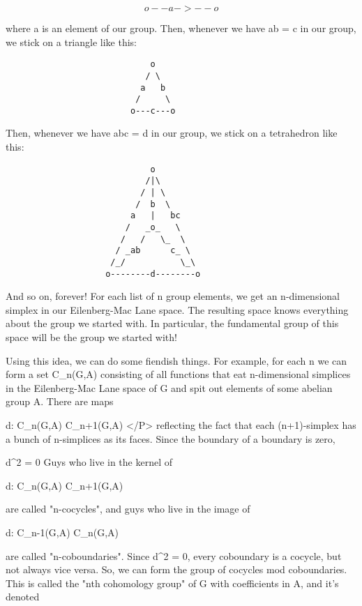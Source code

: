 $$
                         o--a->--o
$$
    
where a is an element of our group.  Then, whenever we have ab = c in 
our group, we stick on a triangle like this:

\begin{verbatim}
                             o
                            / \
                           a   b
                          /     \
                         o---c---o
\end{verbatim}
    
Then, whenever we have abc = d in our group, we stick on a tetrahedron 
like this:

\begin{verbatim}
                             o                      
                            /|\                    
                           / | \                  
                          /  b  \                
                         a   |   bc             
                        /   _o_   \  
                       /   /   \_  \          
                      / _ab      c_ \        
                     /_/           \_\      
                    o--------d--------o
\end{verbatim}
    

And so on, forever!  For each list of n group elements, we get an
n-dimensional simplex in our Eilenberg-Mac Lane space.  The resulting
space knows everything about the group we started with.  In particular, 
the fundamental group of this space will be the group we started with!

Using this idea, we can do some fiendish things.  For example, for each n 
we can form a set C_{n}(G,A) consisting of all functions that eat 
n-dimensional simplices in the Eilenberg-Mac Lane space of G and spit 
out elements of some abelian group A.  There are maps

d: C_{n}(G,A) \to  C_{n+1}(G,A)
</P>
reflecting the fact that each (n+1)-simplex has a bunch of n-simplices
as its faces.  Since the boundary of a boundary is zero, 

d^{2} = 0
Guys who live in the kernel of 

d: C_{n}(G,A) \to  C_{n+1}(G,A)

are called "n-cocycles", and guys who live in the image of

d: C_{n-1}(G,A) \to  C_{n}(G,A)

are called "n-coboundaries".   Since d^{2} 
= 0, every coboundary is
a cocycle, but not always vice versa.  So, we can form the group of
cocycles mod coboundaries.  This is called the "nth cohomology
group" of G with coefficients in A, and it's denoted

